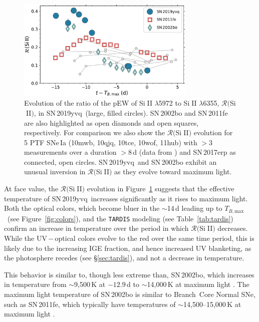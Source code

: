 \documentclass[twocolumn]{aastex63}
\def\ion#1#2{#1$\;${\footnotesize\rm{#2}}\relax}
\newcommand{\tbmax}{$T_{B,\mathrm{max}}$}
\newcommand{\sn}{SN\,2019yvq}
\begin{document}
\begin{figure}
    \centering
    \includegraphics[width=3.35in]{./figures/R_evolution.pdf}
    \caption{Evolution of the ratio of the pEW of \ion{Si}{II} $\lambda$5972
    to \ion{Si}{II} $\lambda$6355, $\mathcal{R}($\ion{Si}{II}$)$, in \sn\
    (large, filled circles). SN\,2002bo \citep[data from][]{Benetti04} and
    SN\,2011fe \citep[data from][]{Pereira13} are also highlighted as open
    diamonds and open squares, respectively. For comparison we also show the
    $\mathcal{R}($\ion{Si}{II}$)$ evolution for 5 PTF SNe\,Ia (10mwb, 10qjq,
    10tce, 10wof, 11hub) with $> 3$ measurements over a duration $> 8$\,d
    (data from \citealt{Maguire14}) and SN\,2017erp \citep[data
    from][]{Brown19} as connected, open circles. \sn\ and SN\,2002bo exhibit
    an unusual inversion in $\mathcal{R}($\ion{Si}{II}$)$ as they evolve
    toward maximum light.}
    \label{fig:r_evo}
\end{figure}

At face value, the $\mathcal{R}($\ion{Si}{II}$)$ evolution in
Figure~\ref{fig:r_evo} suggests that the effective temperature of \sn\
increases significantly as it rises to maximum light. Both the optical colors,
which become bluer in the $\sim$14\,d leading up to \tbmax\ (see
Figure~\ref{fig:colors}), and the \texttt{TARDIS} modeling (see
Table~\ref{tab:tardis}) confirm an increase in temperature over the period in
which $\mathcal{R}($\ion{Si}{II}$)$ decreases. While the UV\,$-$\,optical
colors evolve to the red over the same time period, this is likely due to the
increasing IGE fraction, and hence increased UV blanketing, as the photosphere
recedes (see \S\ref{sec:tardis}), and not a decrease in temperature.

This behavior is similar to, though less extreme than, SN\,2002bo, which
increases in temperature from $\sim$9,500\,K at $-12.9$\,d to $\sim$14,000\,K
at maximum light \citep{Stehle05}. The maximum light temperature of SN\,2002bo
is similar to Branch~Core Normal SNe, such as SN\,2011fe, which
typically have temperatures of $\sim$14,500--15,000\,K at maximum light
\citep{Mazzali14}.
\end{document}
